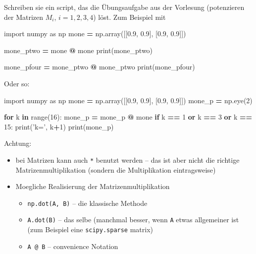 \documentclass[]{book}
\newenvironment{Shaded}{\begin{snugshade}}{\end{snugshade}}
\newcommand{\BuiltInTok}[1]{#1}
\newcommand{\ControlFlowTok}[1]{\textcolor[rgb]{0.13,0.29,0.53}{\textbf{#1}}}
\newcommand{\DecValTok}[1]{\textcolor[rgb]{0.00,0.00,0.81}{#1}}
\newcommand{\FloatTok}[1]{\textcolor[rgb]{0.00,0.00,0.81}{#1}}
\newcommand{\ImportTok}[1]{#1}
\newcommand{\KeywordTok}[1]{\textcolor[rgb]{0.13,0.29,0.53}{\textbf{#1}}}
\newcommand{\NormalTok}[1]{#1}
\newcommand{\OperatorTok}[1]{\textcolor[rgb]{0.81,0.36,0.00}{\textbf{#1}}}
\newcommand{\StringTok}[1]{\textcolor[rgb]{0.31,0.60,0.02}{#1}}
\providecommand{\tightlist}{%
  \setlength{\itemsep}{0pt}\setlength{\parskip}{0pt}}
\theoremstyle{definition}
\theoremstyle{definition}
\theoremstyle{definition}
\theoremstyle{definition}
\theoremstyle{remark}
\begin{document}
Schreiben sie ein script, das die Übungsaufgabe aus der Vorlesung (potenzieren der Matrizen \(M_i\), \(i=1,2,3,4\)) löst. Zum Beispiel mit

\begin{Shaded}
\begin{Highlighting}[]
\ImportTok{import}\NormalTok{ numpy }\ImportTok{as}\NormalTok{ np}
\NormalTok{mone }\OperatorTok{=}\NormalTok{ np.array([[}\FloatTok{0.9}\NormalTok{, }\FloatTok{0.9}\NormalTok{], [}\FloatTok{0.9}\NormalTok{, }\FloatTok{0.9}\NormalTok{]])}

\NormalTok{mone_ptwo }\OperatorTok{=}\NormalTok{ mone }\OperatorTok{@}\NormalTok{ mone}
\BuiltInTok{print}\NormalTok{(mone_ptwo)}

\NormalTok{mone_pfour }\OperatorTok{=}\NormalTok{ mone_ptwo }\OperatorTok{@}\NormalTok{ mone_ptwo}
\BuiltInTok{print}\NormalTok{(mone_pfour)}
\end{Highlighting}
\end{Shaded}

Oder so:

\begin{Shaded}
\begin{Highlighting}[]
\ImportTok{import}\NormalTok{ numpy }\ImportTok{as}\NormalTok{ np}
\NormalTok{mone }\OperatorTok{=}\NormalTok{ np.array([[}\FloatTok{0.9}\NormalTok{, }\FloatTok{0.9}\NormalTok{], [}\FloatTok{0.9}\NormalTok{, }\FloatTok{0.9}\NormalTok{]])}
\NormalTok{mone_p }\OperatorTok{=}\NormalTok{ np.eye(}\DecValTok{2}\NormalTok{)}

\ControlFlowTok{for}\NormalTok{ k }\KeywordTok{in} \BuiltInTok{range}\NormalTok{(}\DecValTok{16}\NormalTok{):}
\NormalTok{    mone_p }\OperatorTok{=}\NormalTok{ mone_p }\OperatorTok{@}\NormalTok{ mone}
    \ControlFlowTok{if}\NormalTok{ k }\OperatorTok{==} \DecValTok{1} \KeywordTok{or}\NormalTok{ k }\OperatorTok{==} \DecValTok{3} \KeywordTok{or}\NormalTok{ k }\OperatorTok{==} \DecValTok{15}\NormalTok{:}
        \BuiltInTok{print}\NormalTok{(}\StringTok{'k='}\NormalTok{, k}\OperatorTok{+}\DecValTok{1}\NormalTok{)}
        \BuiltInTok{print}\NormalTok{(mone_p)}
\end{Highlighting}
\end{Shaded}

Achtung:

\begin{itemize}
\tightlist
\item
  bei Matrizen kann auch \texttt{*} benutzt werden -- das ist aber nicht die richtige Matrizenmultiplikation (sondern die Multiplikation eintragsweise)
\item
  Moegliche Realisierung der Matrizenmultiplikation

  \begin{itemize}
  \tightlist
  \item
    \texttt{np.dot(A,\ B)} -- die klassische Methode
  \item
    \texttt{A.dot(B)} -- das selbe (manchmal besser, wenn \texttt{A} etwas allgemeiner ist (zum Beispiel eine \texttt{scipy.sparse} matrix)
  \item
    \texttt{A\ @\ B} -- convenience Notation
  \end{itemize}
\end{itemize}
\end{document}
